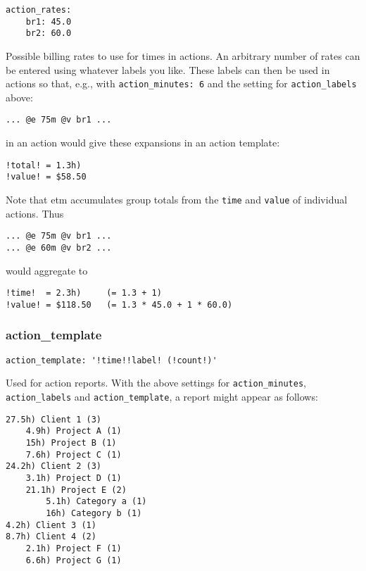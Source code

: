 \documentclass[]{article}
\begin{document}
\begin{verbatim}
action_rates:
    br1: 45.0
    br2: 60.0
\end{verbatim}

Possible billing rates to use for times in actions. An arbitrary number
of rates can be entered using whatever labels you like. These labels can
then be used in actions so that, e.g., with \texttt{action\_minutes: 6}
and the setting for \texttt{action\_labels} above:

\begin{verbatim}
... @e 75m @v br1 ...
\end{verbatim}

in an action would give these expansions in an action template:

\begin{verbatim}
!total! = 1.3h)
!value! = $58.50
\end{verbatim}

Note that etm accumulates group totals from the \texttt{time} and
\texttt{value} of individual actions. Thus

\begin{verbatim}
... @e 75m @v br1 ...
... @e 60m @v br2 ...
\end{verbatim}

would aggregate to

\begin{verbatim}
!time!  = 2.3h)     (= 1.3 + 1)
!value! = $118.50   (= 1.3 * 45.0 + 1 * 60.0)
\end{verbatim}

\subsubsection{action\_template}

\begin{verbatim}
action_template: '!time!!label! (!count!)'
\end{verbatim}

Used for action reports. With the above settings for
\texttt{action\_minutes}, \texttt{action\_labels} and
\texttt{action\_template}, a report might appear as follows:

\begin{verbatim}
27.5h) Client 1 (3)
    4.9h) Project A (1)
    15h) Project B (1)
    7.6h) Project C (1)
24.2h) Client 2 (3)
    3.1h) Project D (1)
    21.1h) Project E (2)
        5.1h) Category a (1)
        16h) Category b (1)
4.2h) Client 3 (1)
8.7h) Client 4 (2)
    2.1h) Project F (1)
    6.6h) Project G (1)
\end{verbatim}
\end{document}
